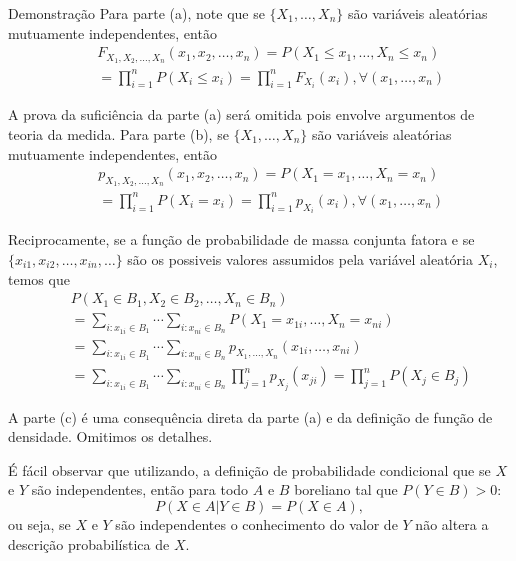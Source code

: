\begin{frame}
\begin{block}{Demonstração} Para parte (a), note que se $\{X_1,\ldots,X_n\}$ são  variáveis aleatórias
mutuamente independentes, então
\begin{eqnarray}
& & F_{X_1,X_2,\ldots,X_n}(x_1,x_2,\ldots,x_n)=P(X_1\leq x_1,\ldots,X_n\leq x_n) \nonumber\\
& & =\prod_{i=1}^{n}P(X_i\leq x_i)=\prod_{i=1}^{n}F_{X_i}(x_i),\forall (x_1,\ldots,x_n) \nonumber
\end{eqnarray}

A prova da suficiência da parte (a) será omitida pois envolve argumentos de teoria da medida. Para parte (b), se $\{X_1,\ldots,X_n\}$ são  variáveis aleatórias
mutuamente independentes, então
\begin{eqnarray}
& & p_{X_1,X_2,\ldots,X_n}(x_1,x_2,\ldots,x_n)=P(X_1= x_1,\ldots,X_n= x_n) \nonumber\\
& & =\prod_{i=1}^{n}P(X_i= x_i)=\prod_{i=1}^{n}p_{X_i}(x_i),\forall (x_1,\ldots,x_n) \nonumber
\end{eqnarray}
\end{block}
\end{frame}

\begin{frame}
\vspace{-0.1cm}
\begin{block}{}
Reciprocamente, se a função de probabilidade de massa conjunta fatora e se $\{x_{i1},x_{i2},\ldots,x_{in},\ldots\}$ são os possiveis valores assumidos pela variável aleatória $X_i$, temos que
\begin{eqnarray}
& & P(X_1\in B_1,X_2\in B_2,\ldots,X_n\in B_n)\nonumber \\
& & =\sum_{i:x_{1i}\in B_1}\cdots\sum_{i:x_{ni}\in B_n}P(X_1=x_{1i},\ldots,X_n=x_{ni})\nonumber\\
& & = \sum_{i:x_{1i}\in B_1}\cdots\sum_{i:x_{ni}\in B_n}p_{X_1,\ldots,X_n}(x_{1i},\ldots,x_{ni}) \nonumber\\
& & =\sum_{i:x_{1i}\in B_1}\cdots\sum_{i:x_{ni}\in B_n}\prod_{j=1}^{n}p_{X_j}(x_{ji})=\prod_{j=1}^{n}P(X_j\in B_j) \nonumber
\end{eqnarray}

A parte (c) é uma consequência direta da parte (a) e da definição de função de densidade. Omitimos os detalhes.
\end{block}

\begin{nota}É fácil observar que utilizando, a definição de probabilidade
condicional que se $X$ e $Y$ são independentes, então para todo $A$
e $B$ boreliano tal que $P(Y\in B)>0$:
$$P(X\in A|Y\in B)=P(X\in A),$$
ou seja, se $X$ e $Y$ são independentes o conhecimento do valor de
$Y$ não altera a descrição probabilística de $X$.
\end{nota}
\end{frame}

